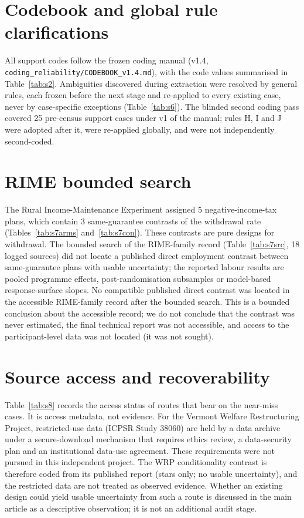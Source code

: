 \documentclass[11pt]{article}
\begin{document}


\section{Codebook and global rule clarifications}

All support codes follow the frozen coding manual (v1.4, \texttt{coding\_reliability/CODEBOOK\_v1.4.md}), with the code values summarised in Table~\ref{tab:s2}. Ambiguities discovered during extraction were resolved by general rules, each frozen before the next stage and re-applied to every existing case, never by case-specific exceptions (Table~\ref{tab:s6}). The blinded second coding pass covered 25 pre-census support cases under v1 of the manual; rules H, I and J were adopted after it, were re-applied globally, and were not independently second-coded. %



\section{RIME bounded search}\label{sec:rime}

The Rural Income-Maintenance Experiment assigned 5 negative-income-tax plans, which contain 3 same-guarantee contrasts of the withdrawal rate (Tables~\ref{tab:s7arms} and~\ref{tab:s7con}). These contrasts are pure designs for withdrawal. %
The bounded search of the RIME-family record (Table~\ref{tab:s7src}, 18 logged sources) did not locate a published direct employment contrast between same-guarantee plans with usable uncertainty; the reported labour results are pooled programme effects, post-randomisation subsamples or model-based response-surface slopes. No compatible published direct contrast was located in the accessible RIME-family record after the bounded search. This is a bounded conclusion about the accessible record; we do not conclude that the contrast was never estimated, the final technical report was not accessible, and access to the participant-level data was not located (it was not sought). %



\section{Source access and recoverability}

Table~\ref{tab:s8} records the access status of routes that bear on the near-miss cases. It is access metadata, not evidence. For the Vermont Welfare Restructuring Project, restricted-use data (ICPSR Study 38060) are held by a data archive under a secure-download mechanism that requires ethics review, a data-security plan and an institutional data-use agreement. These requirements were not pursued in this independent project. The WRP conditionality contrast is therefore coded from its published report (stars only; no usable uncertainty), and the restricted data are not treated as observed evidence. Whether an existing design could yield usable uncertainty from such a route is discussed in the main article as a descriptive observation; it is not an additional audit stage. %
\end{document}
